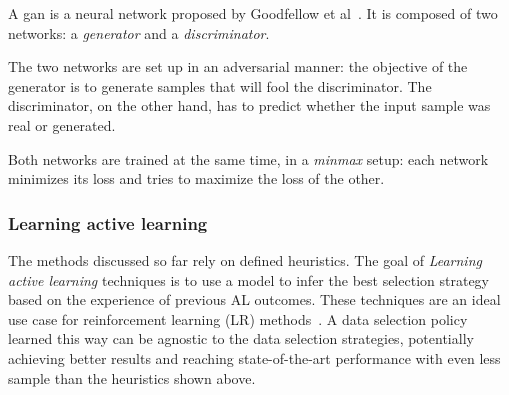     A \acrshort{gan} is a neural network proposed by Goodfellow et al~\cite{goodfellow2020generative}. It is composed of two networks: a \emph{generator} and a \emph{discriminator}.
    
    The two networks are set up in an adversarial manner: the objective of the generator is to generate samples that will fool the discriminator. The discriminator, on the other hand, has to predict whether the input sample was real or generated.
    
    Both networks are trained at the same time, in a \emph{minmax} setup: each network minimizes its loss and tries to maximize the loss of the other.
    
    \subsubsection*{Learning active learning}
    The methods discussed so far rely on defined heuristics. The goal of \textit{Learning active learning} techniques is to use a model to infer the best selection strategy based on the experience of previous AL outcomes. These techniques are an ideal use case for reinforcement learning (LR) methods~\cite{budd2021survey}.
    A data selection policy learned this way can be agnostic to the data selection strategies, potentially achieving better results and reaching state-of-the-art performance with even less sample than the heuristics shown above.
    

